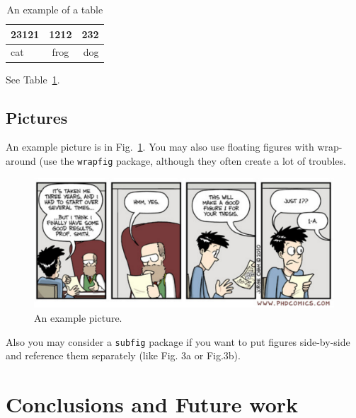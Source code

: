 \documentclass[a4paper,11pt,phdthesis,twoside,oneandhalfspace,pdflatex]{cssethesis} %
\begin{document}
\begin{table}[ht]
	\begin{center}
	\begin{tabular}{lcr}
	23121 & 1212 & 232 \\ \hline  
	cat & frog & dog
	\end{tabular}
	\end{center}
\caption{An example of a table}
\label{tab:example}
\end{table}

See Table~\ref{tab:example}.


\section{Pictures}
An example picture is in Fig.~\ref{fig:examplepic}. You may also use floating figures with wrap-around (use the \verb|wrapfig| package, although they often create a lot of troubles.

\begin{figure}[ht!]
\centering\includegraphics[width=0.9\linewidth]{phd101310s}
\caption{An example picture.}
\label{fig:examplepic}
\end{figure}

Also you may consider a \verb|subfig| package if you want to put figures side-by-side and reference them separately (like Fig. 3a or Fig.3b).





\chapter{Conclusions and Future work}\label{chap:summary}



\appendix %
\end{document}
